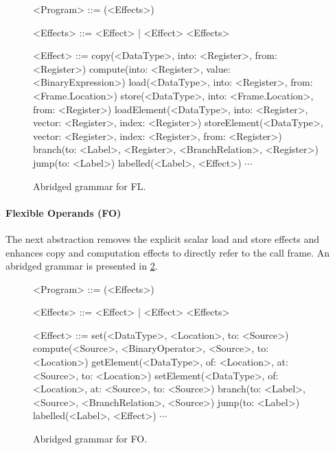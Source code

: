 \documentclass[main.tex]{subfiles}
\begin{document}
\begin{figure}[ht]
	\begin{grammar}
		
		<Program> ::= (<Effects>)
		
		<Effects> ::= <Effect> | <Effect> <Effects>
		
		<Effect> ::= copy(<DataType>, into: <Register>, from: <Register>)
			\alt compute(into: <Register>, value: <BinaryExpression>)
			\alt load(<DataType>, into: <Register>, from: <Frame.Location>)
			\alt store(<DataType>, into: <Frame.Location>, from: <Register>)
			\alt loadElement(<DataType>, into: <Register>, vector: <Register>, index: <Register>)
			\alt storeElement(<DataType>, vector: <Register>, index: <Register>, from: <Register>)
			\alt branch(to: <Label>, <Register>, <BranchRelation>, <Register>)
			\alt jump(to: <Label>)
			\alt labelled(<Label>, <Effect>)
			\alt $\cdots$
		
	\end{grammar}
	\caption{Abridged grammar for FL.}
	\label{bnf:fl}
\end{figure}

\paragraph{Flexible Operands (FO)} The next abstraction removes the explicit scalar load and store effects and enhances copy and computation effects to directly refer to the call frame. An abridged grammar is presented in \cref{bnf:fo}.

\begin{figure}[ht]
	\begin{grammar}
		
		<Program> ::= (<Effects>)
		
		<Effects> ::= <Effect> | <Effect> <Effects>
		
		<Effect> ::= set(<DataType>, <Location>, to: <Source>)
			\alt compute(<Source>, <BinaryOperator>, <Source>, to: <Location>)
			\alt getElement(<DataType>, of: <Location>, at: <Source>, to: <Location>)
			\alt setElement(<DataType>, of: <Location>, at: <Source>, to: <Source>)
			\alt branch(to: <Label>, <Source>, <BranchRelation>, <Source>)
			\alt jump(to: <Label>)
			\alt labelled(<Label>, <Effect>)
			\alt $\cdots$
		
	\end{grammar}
	\caption{Abridged grammar for FO.}
	\label{bnf:fo}
\end{figure}

\biblio{}
\onlyinsubfile{\glsaddall\printglossaries}
\end{document}
